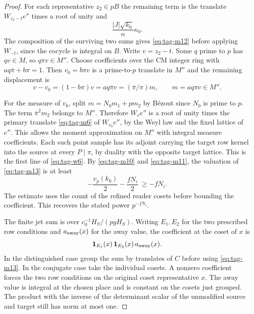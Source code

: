 \begin{proof}
For each representative \(z_2\in pB\) the
remaining term is the translate \(W_{z_2-t}e''\)
times a root of unity and
\[
                             \frac{|J|\sqrt{k_0}}{n}\kappa_0 .
\tag{M13}\label{eq:tag-m13}
\]
The composition of the surviving two sums
gives \eqref{eq:tag-m12} before applying \(W_{-t}\),
since the cocycle is integral on \(B\).
Write \(v=z_2-t\). Some \(q\) prime to \(p\)
has \(qv\in M\), so \(q\pi v\in M''\).
Choose coefficients over the CM integer ring
with \(a q\bar\pi+b\pi=1\). Then
\(v_0=b\pi v\) is a prime-to-\(p\) translate
in \(M''\) and the remaining displacement is
\[
 v-v_0=(1-b\pi)v=aq\bar\pi v=(\bar\pi/\pi)m,
 \qquad m=aq\pi v\in M'' .
\]

For the measure of
\(v_0\), split \(m=N_0 m_1+p m_2\) by
B\'ezout since \(N_0\) is prime to \(p\).
The term \(\bar\pi^2m_2\) belongs to \(M''\).
Therefore \(W_v e''\) is a root of unity times
the primary translate \eqref{eq:tag-m6} of \(W_{v_0}e''\),
by the Weyl law and the fixed lattice of \(e''\).
This allows the moment approximation on \(M''\)
with integral measure coefficients. Each such point
sample has its adjoint carrying the target row
kernel into the source at every \(P\mid\pi\),
by duality with the opposite target lattice.
This is the first line of \eqref{eq:tag-w6}.
By \eqref{eq:tag-m10} and \eqref{eq:tag-m11}, the valuation of \eqref{eq:tag-m13} is at least
\[
                   -\frac{v_p(k_0)}2-\frac{fN_i}{2}
                   \ \ge -fN_i .
\]
The estimate uses the count of the refined reader
cosets before bounding the coefficient. This
recovers the stated power \(p^{-fN_i}\).


The finite jet sum is over
\(c_0^{-1}H_S/(pgH_S)\). Writing \(E_1,E_2\) for the two prescribed row conditions and \(a_{\rm away}(x)\) for the away value, the coefficient at the coset of \(x\) is
\[
  \mathbf1_{E_1}(x)\,\mathbf1_{E_2}(x)\,a_{\rm away}(x).
\]
 In the distinguished
case group the sum by translates of \(C\) before
using \eqref{eq:tag-m13}. In the conjugate case take the
individual cosets. A nonzero coefficient
forces the two row conditions on the original
coset representative \(x\). The away value is
integral at the chosen place and is constant
on the cosets just grouped. The product with
the inverse of the determinant scalar of the
unmodified source and target still has norm at
most one.


\end{proof}
